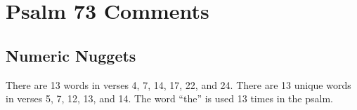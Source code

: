 \section{Psalm 73 Comments}

\subsection{Numeric Nuggets}
There are 13 words in verses 4, 7, 14, 17, 22, and 24. There are 13 unique words in verses 5, 7, 12, 13, and 14.  The word ``the'' is used 13 times in the psalm.